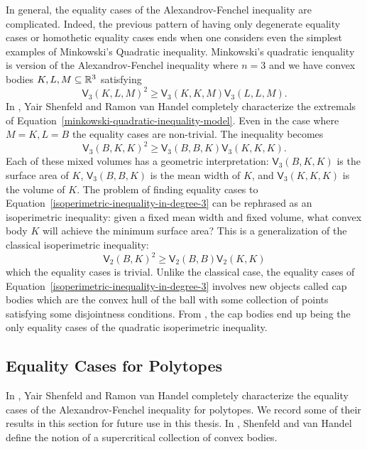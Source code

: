 \documentclass{puthesis-UG}
\begin{document}
In general, the equality cases of the Alexandrov-Fenchel inequality are complicated. Indeed, the previous pattern of having only degenerate equality cases or homothetic equality cases ends when one considers even the simplest examples of Minkowski's Quadratic inequality. Minkowski's quadratic ienquality is version of the Alexandrov-Fenchel inequality where $n = 3$ and we have convex bodies $K, L, M \subseteq \mathbb{R}^3$ satisfying 
\begin{equation} \label{minkowski-quadratic-inequality-model}
	\mathsf{V}_3(K, L, M)^2 \geq \mathsf{V}_3 (K, K, M) \mathsf{V}_3 (L, L, M). 
\end{equation}
In \cite{minkowski-quadratic-inequality}, Yair Shenfeld and Ramon van Handel completely characterize the extremals of Equation~\ref{minkowski-quadratic-inequality-model}. Even in the case where $M = K, L = B$ the equality cases are non-trivial. The inequality becomes
\begin{equation} \label{isoperimetric-inequality-in-degree-3}
	\mathsf{V}_3 (B, K, K)^2 \geq \mathsf{V}_3(B, B, K) \mathsf{V}_3(K, K, K). 
\end{equation}
Each of these mixed volumes has a geometric interpretation: $\mathsf{V}_3 (B, K, K)$ is the surface area of $K$, $\mathsf{V}_3 (B, B, K)$ is the mean width of $K$, and $\mathsf{V}_3 (K, K, K)$ is the volume of $K$. The problem of finding equality cases to Equation~\ref{isoperimetric-inequality-in-degree-3} can be rephrased as an isoperimetric inequality: given a fixed mean width and fixed volume, what convex body $K$ will achieve the minimum surface area? This is a generalization of the classical isoperimetric inequality:
\[
	\mathsf{V}_2(B, K)^2 \geq \mathsf{V}_2(B, B) \mathsf{V}_2(K, K)
\]
which the equality cases is trivial. Unlike the classical case, the equality cases of Equation~\ref{isoperimetric-inequality-in-degree-3} involves new objects called cap bodies which are the convex hull of the ball with some collection of points satisfying some disjointness conditions. From \cite{Bol}, the cap bodies end up being the only equality cases of the quadratic isoperimetric inequality. 

\subsection{Equality Cases for Polytopes}

In \cite{minkowski-quadratic-inequality}, Yair Shenfeld and Ramon van Handel completely characterize the equality cases of the Alexandrov-Fenchel inequality for polytopes. We record some of their results in this section for future use in this thesis. In \cite{shenfeld2022extremals}, Shenfeld and van Handel define the notion of a supercritical collection of convex bodies. 
\end{document}
